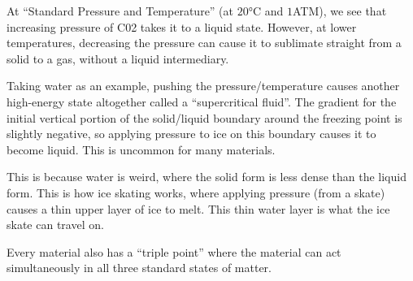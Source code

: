At ``Standard Pressure and Temperature'' (at $20 \si{\degreeCelsius}$ and $1$ATM), we see that increasing pressure of C02 takes it to a liquid state. However, at lower temperatures, decreasing the pressure can cause it to sublimate straight from a solid to a gas, without a liquid intermediary.

Taking water as an example, pushing the pressure/temperature causes another high-energy state altogether called a ``supercritical fluid''. The gradient for the initial vertical portion of the solid/liquid boundary around the freezing point is slightly negative, so applying pressure to ice on this boundary causes it to become liquid. This is uncommon for many materials. 

This is because water is weird, where the solid form is less dense than the liquid form. This is how ice skating works, where applying pressure (from a skate) causes a thin upper layer of ice to melt. This thin water layer is what the ice skate can travel on.

Every material also has a ``triple point'' where the material can act simultaneously in all three standard states of matter. 

